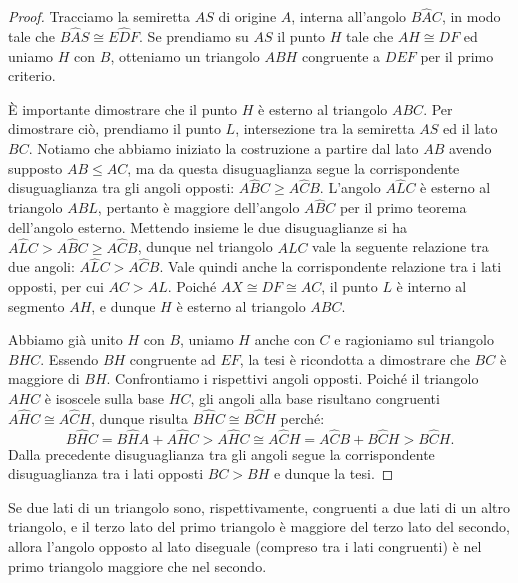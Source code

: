 \begin{proof}
Tracciamo la semiretta \(AS\) di origine \(A\), interna all'angolo 
\(B\widehat{A}C\), in modo tale che \(B\widehat{A}S\cong E\widehat{D}F\). 
Se prendiamo su \(AS\) il punto \(H\) tale che \(AH\cong DF\) ed uniamo \(H\) 
con \(B\), otteniamo un triangolo \(ABH\) congruente a \(DEF\) per il primo 
criterio.

\`E importante dimostrare che il punto \(H\) è esterno al triangolo 
\(ABC\). Per dimostrare ciò, prendiamo il punto \(L\), intersezione tra 
la semiretta \(AS\) ed il lato \(BC\). Notiamo che abbiamo iniziato la 
costruzione a partire dal lato \(AB\) avendo supposto \(AB\leq AC\), ma 
da questa disuguaglianza segue la corrispondente disuguaglianza tra 
gli angoli opposti: \(A\widehat{B}C\geq A\widehat{C}B\). L'angolo 
\(A\widehat{L}C\) è esterno al triangolo \(ABL\), pertanto è maggiore 
dell'angolo \(A\widehat{B}C\) per il primo teorema dell'angolo esterno. 
Mettendo insieme le due disuguaglianze si ha 
\(A\widehat{L}C>A\widehat{B}C\geq A\widehat{C}B\), dunque nel triangolo 
\(ALC\) vale la seguente relazione tra due angoli: 
\(A\widehat{L}C>A\widehat{C}B\). Vale quindi anche la corrispondente 
relazione tra i lati opposti, per cui \(AC>AL\). Poiché \(AX\cong 
DF\cong AC\), il punto \(L\) è interno al segmento \(AH\), e dunque \(H\) è 
esterno al triangolo \(ABC\).

Abbiamo già unito \(H\) con \(B\), uniamo \(H\) anche con \(C\) e ragioniamo 
sul triangolo \(BHC\). Essendo \(BH\) congruente ad \(EF\), la tesi è 
ricondotta a dimostrare che \(BC\) è maggiore di \(BH\). Confrontiamo i 
rispettivi angoli opposti. Poiché il triangolo \(AHC\) è isoscele sulla 
base \(HC\), gli angoli alla base risultano congruenti 
\(A\widehat{H}C\cong A\widehat{C}H\), dunque risulta 
\(B\widehat{H}C\cong B\widehat{C}H\) perché:
\[B\widehat{H}C=B\widehat{H}A+A\widehat{H}C>A\widehat{H}C\cong 
A\widehat{C}H=A\widehat{C}B+B\widehat{C}H>B\widehat{C}H.\]
Dalla precedente disuguaglianza tra gli angoli segue la 
corrispondente disuguaglianza tra i lati opposti \(BC>BH\) e dunque la 
tesi.
\end{proof}

\begin{teorema}
Se due lati di un triangolo sono, rispettivamente, congruenti a due 
lati di un altro triangolo, e il terzo lato del primo triangolo è 
maggiore del terzo lato del secondo, allora l'angolo opposto al lato 
diseguale (compreso tra i lati congruenti) è nel primo triangolo 
maggiore che nel secondo.
\end{teorema}

